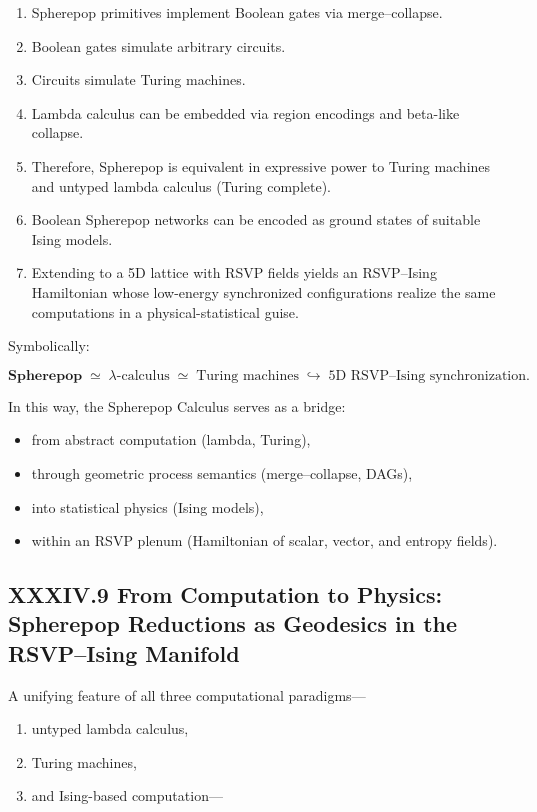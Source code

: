 \documentclass[11pt,letterpaper]{article}
\begin{document}
\begin{enumerate}
  \item Spherepop primitives implement Boolean gates via merge--collapse.
  \item Boolean gates simulate arbitrary circuits.
  \item Circuits simulate Turing machines.
  \item Lambda calculus can be embedded via region encodings and beta-like collapse.
  \item Therefore, Spherepop is equivalent in expressive power to Turing machines and untyped lambda calculus (Turing complete).
  \item Boolean Spherepop networks can be encoded as ground states of suitable Ising models.
  \item Extending to a 5D lattice with RSVP fields yields an RSVP--Ising Hamiltonian whose low-energy synchronized configurations realize the same computations in a physical-statistical guise.
\end{enumerate}

Symbolically:

\[
\boxed{
\textbf{Spherepop} \;\simeq\; \lambda\text{-calculus} \;\simeq\; \text{Turing machines}
\;\hookrightarrow\;
\text{5D RSVP--Ising synchronization}.
}
\]

In this way, the Spherepop Calculus serves as a bridge:

\begin{itemize}
  \item from abstract computation (lambda, Turing),
  \item through geometric process semantics (merge--collapse, DAGs),
  \item into statistical physics (Ising models),
  \item within an RSVP plenum (Hamiltonian of scalar, vector, and entropy fields).
\end{itemize}

\subsection{XXXIV.9 From Computation to Physics:  
Spherepop Reductions as Geodesics in the RSVP–Ising Manifold}

A unifying feature of all three computational paradigms—

\begin{enumerate}
    \item untyped lambda calculus,
    \item Turing machines,
    \item and Ising-based computation—
\end{enumerate}
\end{document}
